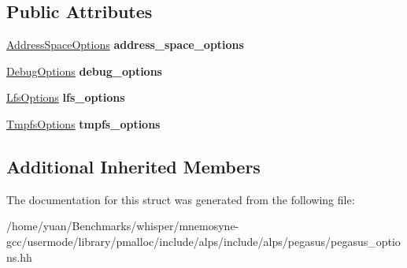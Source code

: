 \subsection*{Public Attributes}
\begin{DoxyCompactItemize}
\item 
\hyperlink{structalps_1_1AddressSpaceOptions}{Address\+Space\+Options} {\bfseries address\+\_\+space\+\_\+options}\hypertarget{structalps_1_1PegasusOptions_a24e2c4559ffde41961bfdbbfeeb756a0}{}\label{structalps_1_1PegasusOptions_a24e2c4559ffde41961bfdbbfeeb756a0}

\item 
\hyperlink{structalps_1_1DebugOptions}{Debug\+Options} {\bfseries debug\+\_\+options}\hypertarget{structalps_1_1PegasusOptions_ae71cf8e8ba799b2004c99568667f68e4}{}\label{structalps_1_1PegasusOptions_ae71cf8e8ba799b2004c99568667f68e4}

\item 
\hyperlink{structalps_1_1LfsOptions}{Lfs\+Options} {\bfseries lfs\+\_\+options}\hypertarget{structalps_1_1PegasusOptions_a46d4088a2b1f4a4f010ad42c0dfd80d1}{}\label{structalps_1_1PegasusOptions_a46d4088a2b1f4a4f010ad42c0dfd80d1}

\item 
\hyperlink{structalps_1_1TmpfsOptions}{Tmpfs\+Options} {\bfseries tmpfs\+\_\+options}\hypertarget{structalps_1_1PegasusOptions_ad924df0f443185396961db63d76e20c3}{}\label{structalps_1_1PegasusOptions_ad924df0f443185396961db63d76e20c3}

\end{DoxyCompactItemize}
\subsection*{Additional Inherited Members}


The documentation for this struct was generated from the following file\+:\begin{DoxyCompactItemize}
\item 
/home/yuan/\+Benchmarks/whisper/mnemosyne-\/gcc/usermode/library/pmalloc/include/alps/include/alps/pegasus/pegasus\+\_\+options.\+hh\end{DoxyCompactItemize}
